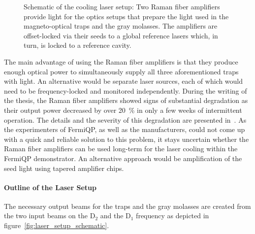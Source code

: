 \begin{figure}
    \caption{Schematic of the cooling laser setup: Two Raman fiber amplifiers provide light for the optics setups that prepare the light used in the magneto-optical traps and the gray molasses. The amplifiers are offset-locked via their seeds to a global reference lasers which, in turn, is locked to a reference cavity.}\label{fig:laser_interplay_schematic}
\end{figure}


The main advantage of using the Raman fiber amplifiers is that they produce enough optical power to simultaneously supply all three aforementioned traps with light. An alternative would be separate laser sources, each of which would need to be frequency-locked and monitored independently. During the writing of the thesis, the Raman fiber amplifiers showed signs of substantial degradation as their output power decreased by over \SI{20}{\percent} in only a few weeks of intermittent operation. The details and the severity of this degradation are presented in~\cite{qesja_design_2022}. As the experimenters of FermiQP, as well as the manufacturers, could not come up with a quick and reliable solution to this problem, it stays uncertain whether the Raman fiber amplifiers can be used long-term for the laser cooling within the FermiQP demonstrator. An alternative approach would be amplification of the seed light using tapered amplifier chips.


\paragraph{Outline of the Laser Setup}
The necessary output beams for the traps and the gray molasses are created from the two input beams on the D$_2$ and the D$_1$ frequency as depicted in figure~\ref{fig:laser_setup_schematic}.

